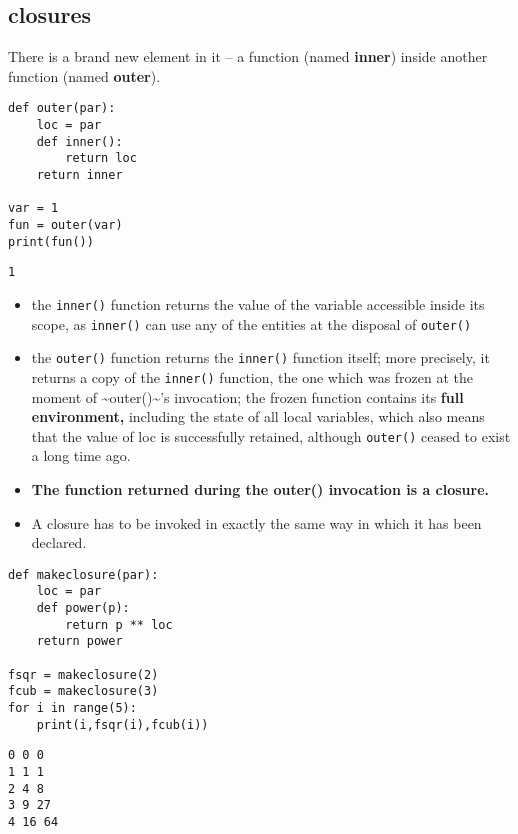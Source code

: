 \documentclass[11pt]{article}
\begin{document}
\subsection{closures}
\label{sec:orgd65fbb5}
There is a brand new element in it – a function (named \textbf{inner}) inside
another function (named \textbf{outer}).

\begin{verbatim}
def outer(par):
	loc = par
	def inner():
		return loc
	return inner

var = 1
fun = outer(var)
print(fun())
\end{verbatim}

\begin{verbatim}
1
\end{verbatim}

\vspace{10 mm}

\begin{itemize}
\item the \texttt{inner()} function returns the value of the variable accessible
inside its scope, as \texttt{inner()} can use any of the entities at the
disposal of \texttt{outer()}
\item the \texttt{outer()} function returns the \texttt{inner()} function itself; more
precisely, it returns a copy of the \texttt{inner()} function, the one
which was frozen at the moment of \textasciitilde{}outer()\textasciitilde{}’s invocation; the frozen
function contains its \textbf{full environment,} including the state of all
local variables, which also means that the value of loc is
successfully retained, although \texttt{outer()} ceased to exist a long time
ago.

\item \textbf{The function returned during the outer() invocation is a closure.}

\item A closure has to be invoked in exactly the same way in which it has been declared.
\end{itemize}

\begin{verbatim}
def makeclosure(par):
	loc = par
	def power(p):
		return p ** loc
	return power

fsqr = makeclosure(2)
fcub = makeclosure(3)
for i in range(5):
	print(i,fsqr(i),fcub(i))
\end{verbatim}

\begin{verbatim}
0 0 0
1 1 1
2 4 8
3 9 27
4 16 64
\end{verbatim}
\end{document}
